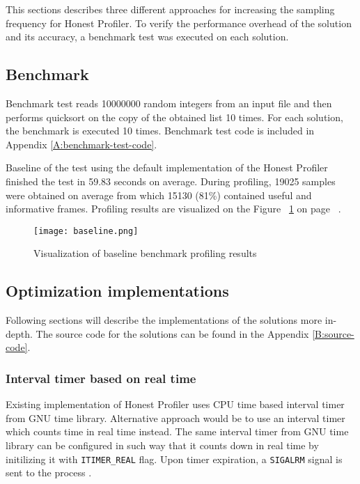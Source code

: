 \documentclass[..thesis.tex]{subfiles}
\begin{document}
This sections describes three different approaches for increasing the sampling frequency for Honest Profiler. To verify the performance overhead of the solution and its accuracy, a benchmark test was executed on each solution.

\subsection{Benchmark}
Benchmark test reads 10000000 random integers from an input file and then performs quicksort on the copy of the obtained list 10 times. For each solution, the benchmark is executed 10 times. Benchmark test code is included in Appendix \ref{A:benchmark-test-code}. 

Baseline of the test using the default implementation of the Honest Profiler finished the test in 59.83 seconds on average. During profiling, 19025 samples were obtained on average from which 15130 (81\%) contained useful and informative frames. Profiling results are visualized on the Figure ~\ref{fig:baseline} on page ~\pageref{fig:baseline}. 

\begin{figure}[h]
\texttt{[image: baseline.png]}
\caption{Visualization of baseline benchmark profiling results}
\label{fig:baseline}
\end{figure}

\subsection{Optimization implementations}
Following sections will describe the implementations of the solutions more in-depth. The source code for the solutions can be found in the Appendix \ref{B:source-code}.

\subsubsection{Interval timer based on real time}
Existing implementation of Honest Profiler uses CPU time based interval timer from GNU time library. Alternative approach would be to use an interval timer which counts time in real time instead. The same interval timer from GNU time library can be configured in such way that it counts down in real time by initilizing it with \texttt{ITIMER\_REAL} flag. Upon timer expiration, a \texttt{SIGALRM} signal is sent to the process \cite{getitimer2}.
\end{document}
